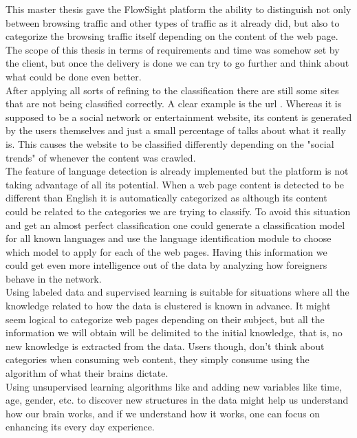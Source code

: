 This master thesis gave the FlowSight platform the ability to distinguish not only between browsing traffic and other types of traffic as it already did, but also to categorize the browsing traffic 
itself depending on the content of the web page. \\ 


The scope of this thesis in terms of requirements and time was somehow set by the client, but once the delivery is done we can try to go further and think about what could be done even better.\\
After applying all sorts of refining to the classification there are still some sites that are not being classified correctly. A clear example is the url . Whereas it is supposed to be
a social network or entertainment website, its content is generated by the users themselves and just a small percentage of talks about what it really is.
This causes the website to be classified differently depending on the "social trends" of whenever the content was crawled.\\
The feature of language detection is already implemented but the platform is not taking advantage of all its potential. When a web page content is detected to be different than English it is automatically
categorized as  although its content could be related to the categories we are trying to classify. To avoid this situation and get an almost perfect classification one could generate a 
classification model for all known languages and use the language identification module to choose which model to apply for each of the web pages. Having this information we could get even more intelligence
out of the data by analyzing how foreigners behave in the network.\\
Using labeled data and supervised learning is suitable for situations where all the knowledge related to how the data is clustered is known in advance. It might seem logical to categorize web pages
depending on their subject, but all the information we will obtain will be delimited to the initial knowledge, that is, no new knowledge is extracted from the data. Users though, don't think about
categories when consuming web content, they simply consume using the algorithm of what their brains dictate.\\
Using unsupervised learning algorithms like  and adding new variables like 
time, age, gender, etc. to discover new structures in the data might help us understand how our brain works, and if we understand how it works, one can focus on enhancing its every day experience.

